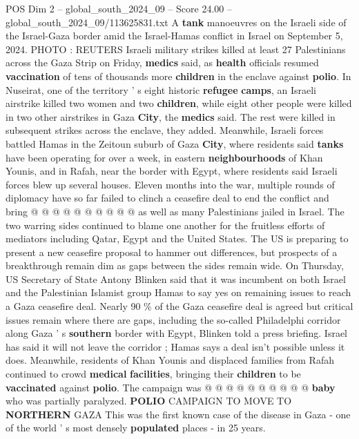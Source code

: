 \begin{textsample}{POS Dim 2 – global\_south\_2024\_09 – Score 24.00 – global\_south\_2024\_09/113625831.txt}  \label{ex:f2_pos_197}
A \textbf{tank} manoeuvres on the Israeli side of the Israel-Gaza border amid the Israel-Hamas conflict in Israel on September 5, 2024.
PHOTO : REUTERS Israeli military strikes killed at least 27 Palestinians across the Gaza Strip on Friday, \textbf{medics} said, as \textbf{health} officials resumed \textbf{vaccination} of tens of thousands more \textbf{children} in the enclave against \textbf{polio}.
In Nuseirat, one of the territory ' s eight historic \textbf{refugee} \textbf{camps}, an Israeli airstrike killed two women and two \textbf{children}, while eight other people were killed in two other airstrikes in Gaza \textbf{City}, the \textbf{medics} said.
The rest were killed in subsequent strikes across the enclave, they added.
Meanwhile, Israeli forces battled Hamas in the Zeitoun suburb of Gaza \textbf{City}, where residents said \textbf{tanks} have been operating for over a week, in eastern \textbf{neighbourhoods} of Khan Younis, and in Rafah, near the border with Egypt, where residents said Israeli forces blew up several houses.
Eleven months into the war, multiple rounds of diplomacy have so far failed to clinch a ceasefire deal to end the conflict and bring @ @ @ @ @ @ @ @ @ @ as well as many Palestinians jailed in Israel.
The two warring sides continued to blame one another for the fruitless efforts of mediators including Qatar, Egypt and the United States.
The US is preparing to present a new ceasefire proposal to hammer out differences, but prospects of a breakthrough remain dim as gaps between the sides remain wide.
On Thursday, US Secretary of State Antony Blinken said that it was incumbent on both Israel and the Palestinian Islamist group Hamas to say yes on remaining issues to reach a Gaza ceasefire deal.
Nearly 90 \% of the Gaza ceasefire deal is agreed but critical issues remain where there are gaps, including the so-called Philadelphi corridor along Gaza ' s \textbf{southern} border with Egypt, Blinken told a press briefing.
Israel has said it will not leave the corridor ; Hamas says a deal isn't possible unless it does.
Meanwhile, residents of Khan Younis and displaced families from Rafah continued to crowd \textbf{medical} \textbf{facilities}, bringing their \textbf{children} to be \textbf{vaccinated} against \textbf{polio}.
The campaign was @ @ @ @ @ @ @ @ @ @ \textbf{baby} who was partially paralyzed. \textbf{POLIO} CAMPAIGN TO MOVE TO \textbf{NORTHERN} GAZA This was the first known case of the disease in Gaza - one of the world ' s most densely \textbf{populated} places - in 25 years.

\end{textsample}
